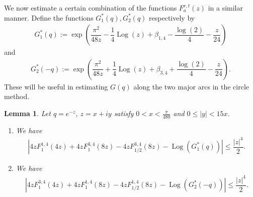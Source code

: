 \documentclass[11pt,reqno]{amsart}
\theoremstyle{definition}
\theoremstyle{plain}
\newtheorem{lemma}[theorem]{Lemma}
\theoremstyle{named}
\DeclareMathOperator\Log{Log}
\numberwithin{equation}{section}
\theoremstyle{example}
\def\lp{\left(}
\def\rp{\right)}
\begin{document}
We now estimate a certain combination of the functions $F_a^{r,t}(z)$ in a similar manner. Define the functions $G_1^*(q), G_2^*(q)$ respectively by
\begin{align*}
    G_1^*(q) := \exp\lp \dfrac{\pi^2}{48z} - \dfrac{1}{4} \Log\lp z \rp + \beta_{1,4} - \dfrac{\log(2)}{4} - \dfrac{z}{24} \rp
\end{align*}
and
\begin{align*}
    G_2^*(-q) := \exp\lp \dfrac{\pi^2}{48z} + \dfrac{1}{4} \Log\lp z \rp + \beta_{3,4} + \dfrac{\log(2)}{4} - \dfrac{z}{24} \rp.
\end{align*}
These will be useful in estimating $G(q)$ along the two major arcs in the circle method.

\begin{lemma} \label{F-Bounds}
Let $q = e^{-z}$, $z = x + iy$ satisfy $0 < x < \frac{\pi}{480}$ and $0 \leq |y| < 15x$.
\begin{enumerate}
    \item We have
    \begin{align*}
        \left| 4z F_1^{1,4}(4z) + 4z F_1^{3,4}(8z) - 4z F_{1/2}^{3,4}(8z) - \Log\lp G_1^*(q) \rp \right| \leq \dfrac{|z|^4}{2}.
    \end{align*}
    \item We have
    \begin{align*}
        \left| 4z F_1^{3,4}(4z) + 4z F_1^{1,4}(8z) - 4z F_{1/2}^{1,4}(8z) - \Log\lp G_2^*(-q) \rp \right| \leq \dfrac{|z|^4}{2}.
    \end{align*}
    \end{enumerate}
\end{lemma}
\end{document}
